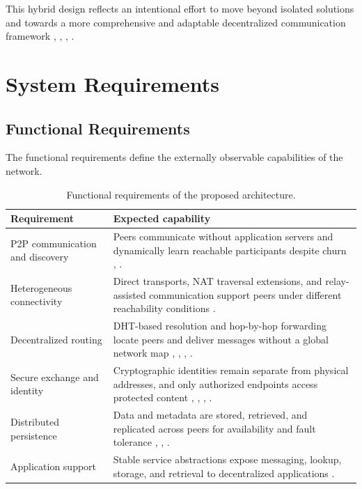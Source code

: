 \documentclass[
  12pt,
  oneside,
  a4paper,
  chapter=TITLE,
  section=TITLE,
  english,
  brazil
]{abntex2}
\begin{document}
This hybrid design reflects an intentional effort to move beyond isolated solutions and towards a more comprehensive and adaptable decentralized communication framework \cite{li2022unreachable}, \cite{augustine2022byzantine}, \cite{mirzaei2018pk}, \cite{qian2016garlic}.

\section{System Requirements}
\subsection{Functional Requirements}

The functional requirements define the externally observable capabilities of the network.

\begin{table}[H]
\centering
\caption{Functional requirements of the proposed architecture.}
\label{tab:functional-requirements}
\begin{tabularx}{\textwidth}{L{0.27\textwidth} Y}
\toprule
\textbf{Requirement} & \textbf{Expected capability} \\
\midrule
P2P communication and discovery & Peers communicate without application servers and dynamically learn reachable participants despite churn \cite{augustine2022byzantine}, \cite{qian2016garlic}. \\
Heterogeneous connectivity & Direct transports, NAT traversal extensions, and relay-assisted communication support peers under different reachability conditions \cite{li2022unreachable}. \\
Decentralized routing & DHT-based resolution and hop-by-hop forwarding locate peers and deliver messages without a global network map \cite{stoica2001chord}, \cite{maymounkov2002kademlia}, \cite{rowstron2001pastry}, \cite{augustine2022byzantine}. \\
Secure exchange and identity & Cryptographic identities remain separate from physical addresses, and only authorized endpoints access protected content \cite{mirzaei2018pk}, \cite{qian2016garlic}, \cite{bos2017kyber}, \cite{nist2024fips203}. \\
Distributed persistence & Data and metadata are stored, retrieved, and replicated across peers for availability and fault tolerance \cite{mehr2019unstructured}, \cite{augustine2022byzantine}, \cite{qian2016garlic}. \\
Application support & Stable service abstractions expose messaging, lookup, storage, and retrieval to decentralized applications \cite{augustine2022byzantine}. \\
\bottomrule
\end{tabularx}
\end{table}
\end{document}
